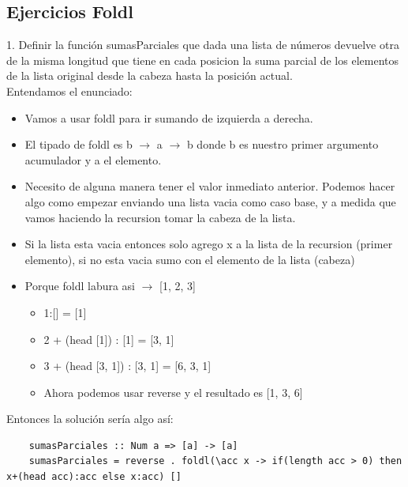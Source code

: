 \documentclass[10pt,a4paper]{article}
\begin{document}
\subsection*{Ejercicios Foldl}
\label{subsec:foldl_ejercicios}
1. Definir la función sumasParciales que dada una lista de números devuelve otra de la misma longitud que tiene en cada posicion la suma parcial de los elementos de la lista original desde la cabeza hasta la posición actual. \\
Entendamos el enunciado: 
\begin{itemize}
    \item Vamos a usar foldl para ir sumando de izquierda a derecha.
    \item El tipado de foldl es b $\rightarrow$ a $\rightarrow$ b donde b es nuestro primer argumento acumulador y a el elemento.
    \item Necesito de alguna manera tener el valor inmediato anterior. Podemos hacer algo como empezar enviando una lista vacia como caso base, y a medida que vamos haciendo la recursion tomar la cabeza de la lista.
    \item Si la lista esta vacia entonces solo agrego x a la lista de la recursion (primer elemento), si no esta vacia sumo con el elemento de la lista (cabeza) 
    \item Porque foldl labura asi $\rightarrow$ [1, 2, 3]
    \begin{itemize}
        \item 1:[] = [1]
        \item 2 + (head [1]) : [1] = [3, 1]
        \item 3 + (head [3, 1]) : [3, 1] = [6, 3, 1]
        \item Ahora podemos usar reverse y el resultado es [1, 3, 6]
    \end{itemize}
\end{itemize}
Entonces la solución sería algo así: 
\begin{lstlisting}
    sumasParciales :: Num a => [a] -> [a]
    sumasParciales = reverse . foldl(\acc x -> if(length acc > 0) then x+(head acc):acc else x:acc) []
\end{lstlisting}
\end{document}

